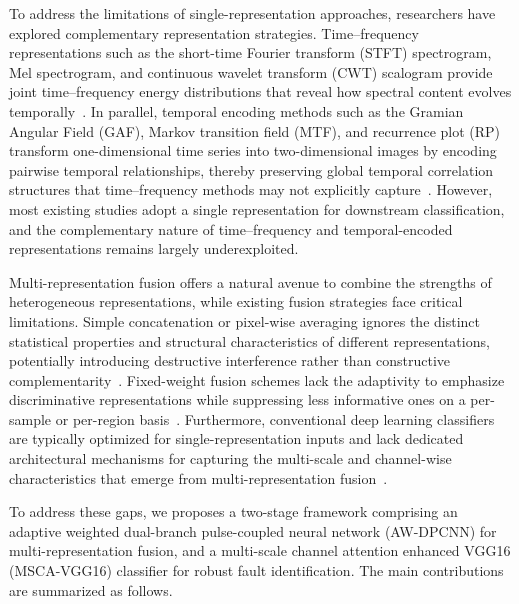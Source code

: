 \documentclass[pdflatex,sn-mathphys-num]{sn-jnl}
\theoremstyle{thmstyleone}%
\theoremstyle{thmstyletwo}%
\theoremstyle{thmstylethree}%
\begin{document}
To address the limitations of single-representation approaches, researchers have explored complementary representation strategies. Time--frequency representations such as the short-time Fourier transform (STFT) spectrogram, Mel spectrogram, and continuous wavelet transform (CWT) scalogram provide joint time--frequency energy distributions that reveal how spectral content evolves temporally~\cite{10226588,DONG2023108934,10659159}. In parallel, temporal encoding methods such as the Gramian Angular Field (GAF), Markov transition field (MTF), and recurrence plot (RP) transform one-dimensional time series into two-dimensional images by encoding pairwise temporal relationships, thereby preserving global temporal correlation structures that time--frequency methods may not explicitly capture~\cite{ZHANG2026106301,10517915,LIU20254863}. However, most existing studies adopt a single representation for downstream classification, and the complementary nature of time--frequency and temporal-encoded representations remains largely underexploited.

Multi-representation fusion offers a natural avenue to combine the strengths of heterogeneous representations, while existing fusion strategies face critical limitations. Simple concatenation or pixel-wise averaging ignores the distinct statistical properties and structural characteristics of different representations, potentially introducing destructive interference rather than constructive complementarity~\cite{8513874,10260234}. Fixed-weight fusion schemes lack the adaptivity to emphasize discriminative representations while suppressing less informative ones on a per-sample or per-region basis~\cite{PENG2012164}. Furthermore, conventional deep learning classifiers are typically optimized for single-representation inputs and lack dedicated architectural mechanisms for capturing the multi-scale and channel-wise characteristics that emerge from multi-representation fusion~\cite{11345448,8788665}.

To address these gaps, we proposes a two-stage framework comprising an adaptive weighted dual-branch pulse-coupled neural network (AW-DPCNN) for multi-representation fusion, and a multi-scale channel attention enhanced VGG16 (MSCA-VGG16) classifier for robust fault identification. The main contributions are summarized as follows.
\end{document}
